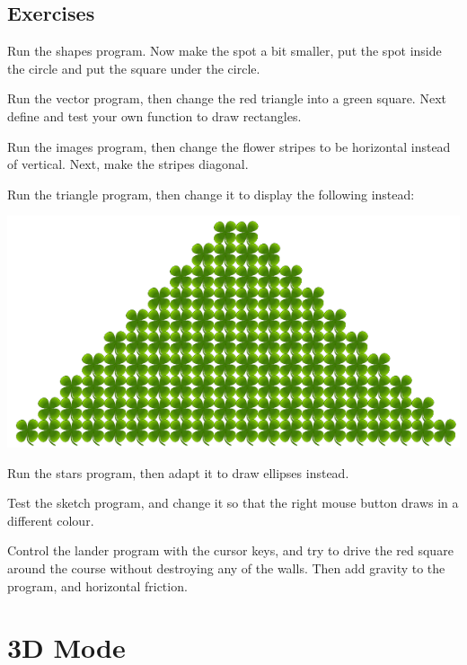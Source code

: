 \documentclass[12pt,a4paper,twoside]{article}
\renewcommand{\_}{\texttt{\symbol{95}}}
\begin{document}
\subsection{Exercises}

\begin{numericlist}
\item Run the shapes program. Now make the spot a bit smaller, put the spot
		inside the circle and put the square under the circle.
\item Run the vector program, then change the red triangle into a green square.
		Next def{i}ne and test your own function to draw rectangles.
\item Run the images program, then change the flower stripes to be horizontal
		instead of vertical. Next, make the stripes diagonal.
\item Run the triangle program, then change it to display the following
		instead:\\
\begin{center}
\includegraphics[scale=0.35,angle=0]{screenshots/artpixel/triangle2}
\end{center}
\item Run the stars program, then adapt it to draw ellipses instead.
\item Test the sketch program, and change it so that the right mouse
		button draws in a different colour.
\item Control the lander program with the cursor keys, and try to drive
		the red square around the course without destroying any of the walls.
		Then add gravity to the program, and horizontal friction.
\end{numericlist}

\section{3D Mode}
\end{document}
